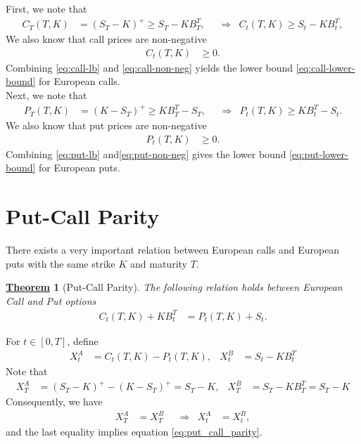 \documentclass[12pt]{book}
\numberwithin{equation}{chapter}
\theoremstyle{plain}
\newtheorem{theorem}{\underline{Theorem}}
\numberwithin{theorem}{section}
\theoremstyle{definition}
\numberwithin{exercise}{chapter}
\let\oldendproof\endproof
\renewenvironment{proof}[1][\proofname]{%
  \oldproof[\scshape\underline{#1}]%
}{\oldendproof}
\newcommand{\<}{\langle}
\renewcommand{\>}{\rangle}
\renewcommand{\(}{\left(}
\renewcommand{\)}{\right)}
\renewcommand{\[}{\left[}
\renewcommand{\]}{\right]}
\theoremstyle{definition}
\numberwithin{question}{section}
\begin{document}
\begin{proof}
First, we note that
\begin{align}
C_T(T,K)
	&=	(S_T - K )^+
	\geq S_T - K B_T^T , &
	&\Rightarrow&
C_t(T,K)
	\geq S_t - K B_t^T , \label{eq:call-lb} 
\end{align}
We also know that call prices are non-negative
\begin{align}
C_t(T,K)
	&\geq 0 . \label{eq:call-non-neg}
\end{align}
Combining \eqref{eq:call-lb} and \eqref{eq:call-non-neg} yields the lower bound \eqref{eq:call-lower-bound} for European calls.
\\[0.5em]
Next, we note that
\begin{align}
P_T(T,K)
	&=	(K - S_T )^+
	\geq K B_T^T - S_T , &
	&\Rightarrow&
P_t(T,K)
	\geq K B_t^T - S_t . \label{eq:put-lb}
\end{align}
We also know that put prices are non-negative
\begin{align}
P_t(T,K)
	&\geq 0 .		\label{eq:put-non-neg}
\end{align}
Combining \eqref{eq:put-lb} and\eqref{eq:put-non-neg} gives the lower bound \eqref{eq:put-lower-bound} for European puts.
\end{proof}

\section{Put-Call Parity}
There exists a very important relation between European calls and European puts with the same strike $K$ and maturity $T$.

\begin{theorem}[Put-Call Parity]
The following relation holds between European Call and Put options
\begin{align} \label{eq:put_call_parity}
C_t(T,K) + K B_t^T 
	&= P_t(T,K) + S_t .
\end{align}
\end{theorem}

\begin{proof}
For $t \in [0,T]$, define
\begin{align}
		X_t^A &= C_t(T,K) - P_t(T,K) , &
		X_t^B &= S_t - K B_t^T 
\end{align}
Note that
\begin{align}
		X_T^A &= (S_T - K)^+ - (K - S_T)^+ = S_T - K , &
		X_T^B &= S_T - K B_T^T = S_T - K
\end{align}
Consequently, we have
\begin{align}
X_T^A
	& = X_T^B & 
	&\Rightarrow& 
X_t^A 
	&= X_t^B ,  
\end{align}
and the last equality implies equation \eqref{eq:put_call_parity}.
\end{proof}
\end{document}
